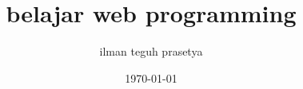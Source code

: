 \documentclass[12pt]{book}
\begin{document}
	\tableofcontents
	\title{belajar web programming}
	\author{ilman teguh prasetya}
	\date{\today}
	\maketitle

	
\end{document}
